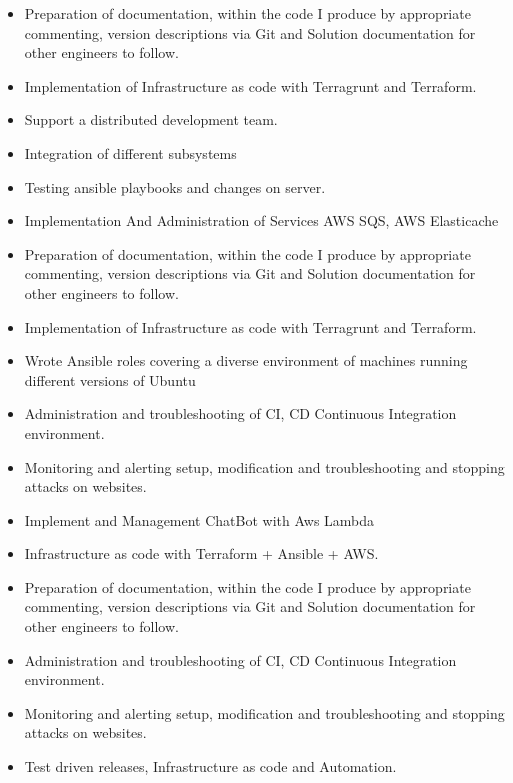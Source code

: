 \divider

\begin{itemize}
  \item Preparation of documentation, within the code I produce by appropriate commenting, version descriptions via Git and Solution documentation for other engineers to follow.
  \item Implementation of Infrastructure as code with Terragrunt and Terraform.
  \item Support a distributed development team.
  \item Integration of different subsystems
  \item Testing ansible playbooks and changes on server.
  \item Implementation And Administration of Services AWS SQS, AWS Elasticache
\end{itemize}

\divider

\begin{itemize}
  \item Preparation of documentation, within the code I produce by appropriate commenting, version descriptions via Git and Solution documentation for other engineers to follow.
  \item Implementation of Infrastructure as code with Terragrunt and Terraform.
  \item Wrote Ansible roles covering a diverse environment of machines running different versions of Ubuntu
  \item Administration and troubleshooting of CI, CD Continuous Integration environment.
  \item Monitoring and alerting setup, modification and troubleshooting and stopping attacks on websites.
  \item Implement and Management ChatBot with Aws Lambda
\end{itemize}

\divider

\begin{itemize}
  \item Infrastructure as code with Terraform + Ansible + AWS.
  \item Preparation of documentation, within the code I produce by appropriate commenting, version descriptions via Git and Solution documentation for other engineers to follow.
  \item Administration and troubleshooting of CI, CD Continuous Integration environment.
  \item Monitoring and alerting setup, modification and troubleshooting and stopping attacks on websites.
  \item Test driven releases, Infrastructure as code and Automation.
\end{itemize}

